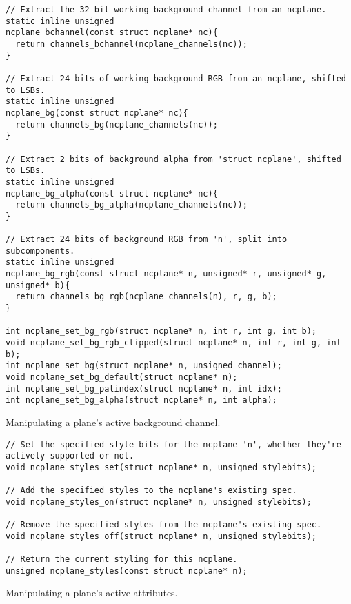 \begin{listing}[!htbp]
\begin{verbatim}
// Extract the 32-bit working background channel from an ncplane.
static inline unsigned
ncplane_bchannel(const struct ncplane* nc){
  return channels_bchannel(ncplane_channels(nc));
}

// Extract 24 bits of working background RGB from an ncplane, shifted to LSBs.
static inline unsigned
ncplane_bg(const struct ncplane* nc){
  return channels_bg(ncplane_channels(nc));
}

// Extract 2 bits of background alpha from 'struct ncplane', shifted to LSBs.
static inline unsigned
ncplane_bg_alpha(const struct ncplane* nc){
  return channels_bg_alpha(ncplane_channels(nc));
}

// Extract 24 bits of background RGB from 'n', split into subcomponents.
static inline unsigned
ncplane_bg_rgb(const struct ncplane* n, unsigned* r, unsigned* g, unsigned* b){
  return channels_bg_rgb(ncplane_channels(n), r, g, b);
}

int ncplane_set_bg_rgb(struct ncplane* n, int r, int g, int b);
void ncplane_set_bg_rgb_clipped(struct ncplane* n, int r, int g, int b);
int ncplane_set_bg(struct ncplane* n, unsigned channel);
void ncplane_set_bg_default(struct ncplane* n);
int ncplane_set_bg_palindex(struct ncplane* n, int idx);
int ncplane_set_bg_alpha(struct ncplane* n, int alpha);
\end{verbatim}
\caption{Manipulating a plane's active background channel.}
\label{listing:planebg}
\end{listing}

\begin{listing}[!htbp]
\begin{verbatim}
// Set the specified style bits for the ncplane 'n', whether they're actively supported or not.
void ncplane_styles_set(struct ncplane* n, unsigned stylebits);

// Add the specified styles to the ncplane's existing spec.
void ncplane_styles_on(struct ncplane* n, unsigned stylebits);

// Remove the specified styles from the ncplane's existing spec.
void ncplane_styles_off(struct ncplane* n, unsigned stylebits);

// Return the current styling for this ncplane.
unsigned ncplane_styles(const struct ncplane* n);
\end{verbatim}
\caption{Manipulating a plane's active attributes.}
\label{listing:planeattr}
\end{listing}


